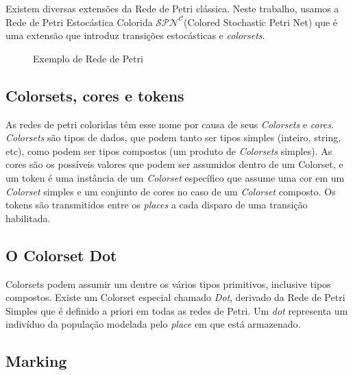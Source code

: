 \documentclass[a4paper,10pt]{article}
\newcommand{\SPNC}{$\mathcal{SPN}^{\mathcal{C}}$}
\begin{document}
		Existem diversas extensões da Rede de Petri clássica. Neste trabalho, usamos a Rede de Petri Estocástica Colorida 
		\SPNC (Colored Stochastic Petri Net) que é uma extensão que introduz transições estocásticas e \textit{colorsets}. 
		
		\begin{figure}
			\begin{center}
				
				\vspace{-0.5cm}
				\caption{Exemplo de Rede de Petri} \label{fig:M1}
			\end{center}
		\end{figure}
		
		\subsection{Colorsets, cores e tokens}
			\label{subs:color}
			
			As redes de petri coloridas têm esse nome por causa de seus \textit{Colorsets} e \textit{cores}. \textit{Colorsets} são tipos 
			de dados, que podem tanto ser tipos simples (inteiro, string, etc), como podem ser tipos compostos 
			(um produto de \textit{Colorsets} simples). As cores são os possíveis valores que podem ser assumidos dentro de um Colorset, 
			e um token é uma instância de um \textit{Colorset} específico que assume uma cor em um \textit{Colorset} 
			simples e um conjunto de cores no caso de um \textit{Colorset} composto. 
			Os tokens são transmitidos entre os \textit{places} a cada disparo de uma transição habilitada. 			
			
		\subsection{O Colorset Dot}
		
			Colorsets podem assumir um dentre os vários tipos primitivos, inclusive tipos compostos. 
			Existe um Colorset especial chamado \textit{Dot}, derivado da Rede de Petri Simples 
			que é definido a priori em todas as redes de Petri. 			
			Um \textit{dot} representa um indivíduo da população modelada pelo \textit{place} em que está armazenado.
		
		\subsection{Marking}
		
\end{document}
